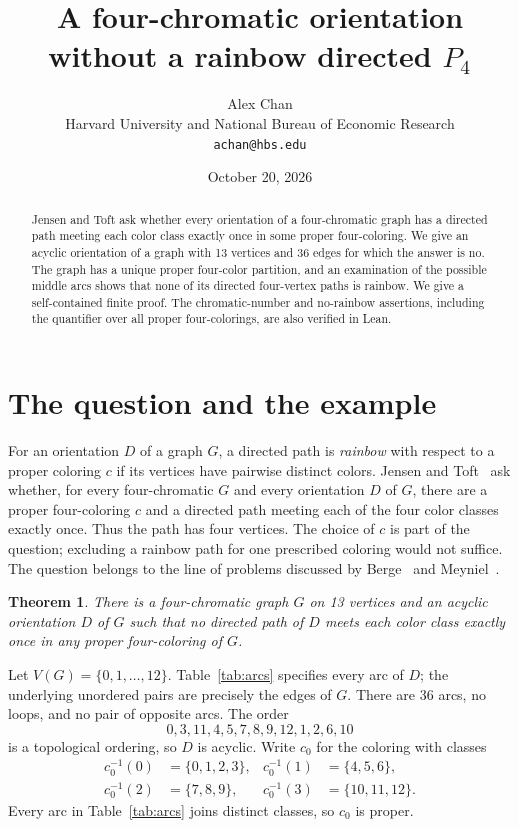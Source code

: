 \documentclass[11pt]{article}
\title{A four-chromatic orientation without a rainbow directed $P_4$}
\author{Alex Chan\\[2pt]
  \small Harvard University and National Bureau of Economic Research\\[-1pt]
  \small \texttt{achan@hbs.edu}}
\date{October 20, 2026}
\newtheorem{theorem}{Theorem}
\begin{document}
\maketitle

\begin{abstract}
Jensen and Toft ask whether every orientation of a four-chromatic graph has a directed path meeting each color class exactly once in some proper four-coloring. We give an acyclic orientation of a graph with 13 vertices and 36 edges for which the answer is no. The graph has a unique proper four-color partition, and an examination of the possible middle arcs shows that none of its directed four-vertex paths is rainbow. We give a self-contained finite proof. The chromatic-number and no-rainbow assertions, including the quantifier over all proper four-colorings, are also verified in Lean.
\end{abstract}

\section{The question and the example}
For an orientation $D$ of a graph $G$, a directed path is \emph{rainbow} with respect to a proper coloring $c$ if its vertices have pairwise distinct colors. Jensen and Toft~\cite[Section~13.7, pp.~214--215]{JT} ask whether, for every four-chromatic $G$ and every orientation $D$ of $G$, there are a proper four-coloring $c$ and a directed path meeting each of the four color classes exactly once. Thus the path has four vertices. The choice of $c$ is part of the question; excluding a rainbow path for one prescribed coloring would not suffice. The question belongs to the line of problems discussed by Berge~\cite{Berge} and Meyniel~\cite{Meyniel}.

\begin{theorem}\label{thm:main}
There is a four-chromatic graph $G$ on 13 vertices and an acyclic orientation $D$ of $G$ such that no directed path of $D$ meets each color class exactly once in any proper four-coloring of $G$.
\end{theorem}

Let $V(G)=\{0,1,\ldots,12\}$. Table~\ref{tab:arcs} specifies every arc of $D$; the underlying unordered pairs are precisely the edges of $G$. There are 36 arcs, no loops, and no pair of opposite arcs. The order
\[
0,3,11,4,5,7,8,9,12,1,2,6,10
\]
is a topological ordering, so $D$ is acyclic. Write $c_0$ for the coloring with classes
\begin{equation}\label{eq:classes}
\begin{aligned}
c_0^{-1}(0)&=\{0,1,2,3\},&c_0^{-1}(1)&=\{4,5,6\},\\
c_0^{-1}(2)&=\{7,8,9\},&c_0^{-1}(3)&=\{10,11,12\}.
\end{aligned}
\end{equation}
Every arc in Table~\ref{tab:arcs} joins distinct classes, so $c_0$ is proper.
\end{document}
